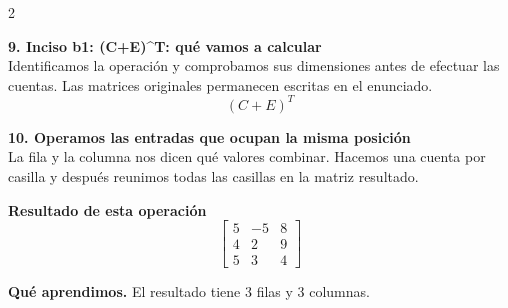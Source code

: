 \documentclass[11pt,a4paper,landscape]{article}
\begin{document}
\begin{multicols*}{2}
\begin{minipage}{\linewidth}
\end{minipage}\par\medskip
\noindent\begin{minipage}{\linewidth}\textbf{9. Inciso b1: (C+E)\textasciicircum{}T: qué vamos a calcular}\\[2pt]Identificamos la operación y comprobamos sus dimensiones antes de efectuar las cuentas. Las matrices originales permanecen escritas en el enunciado.
\[(C+E)^T\]
\end{minipage}\par\medskip
\noindent\begin{minipage}{\linewidth}\textbf{10. Operamos las entradas que ocupan la misma posición}\\[2pt]La fila y la columna nos dicen qué valores combinar. Hacemos una cuenta por casilla y después reunimos todas las casillas en la matriz resultado.
\par{}\par\smallskip
\par\smallskip \textbf{Resultado de esta operación}\[\begin{bmatrix}5 & -5 & 8\\4 & 2 & 9\\5 & 3 & 4\end{bmatrix}\]
\par\smallskip\textbf{Qué aprendimos.} El resultado tiene 3 filas y 3 columnas.
\end{minipage}\par\medskip

\end{multicols*}
\end{document}
